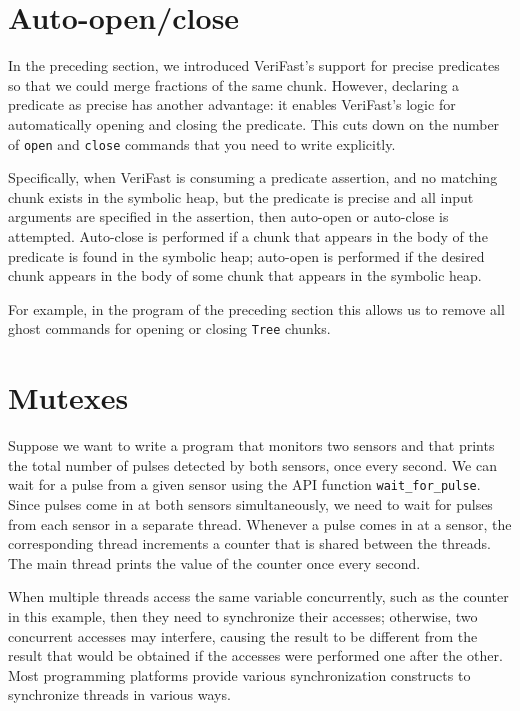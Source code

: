 \documentclass{article}
\begin{document}
\section{Auto-open/close}\label{section:auto-open-close}

In the preceding section, we introduced VeriFast's support for
precise predicates so that we could merge fractions of the same
chunk. However, declaring a predicate as precise has another
advantage: it enables VeriFast's logic for automatically
opening and closing the predicate. This cuts down on the number
of \lstinline|open| and \lstinline|close| commands that you
need to write explicitly.

Specifically, when VeriFast is consuming a predicate assertion,
and no matching chunk exists in the symbolic heap, but the
predicate is precise and all input arguments are specified in
the assertion, then auto-open or auto-close is attempted.
Auto-close is performed if a chunk that appears in the body of
the predicate is found in the symbolic heap; auto-open is
performed if the desired chunk appears in the body of some
chunk that appears in the symbolic heap.

For example, in the program of the preceding section this
allows us to remove all ghost commands for opening or closing
\lstinline|Tree| chunks.

\section{Mutexes}\label{section:mutexes}

Suppose we want to write a program that monitors two sensors
and that prints the total number of pulses detected by both
sensors, once every second. We can wait for a pulse from a
given sensor using the API function \lstinline!wait_for_pulse!.
Since pulses come in at both sensors simultaneously, we need to
wait for pulses from each sensor in a separate thread. Whenever
a pulse comes in at a sensor, the corresponding thread
increments a counter that is shared between the threads. The
main thread prints the value of the counter once every second.

When multiple threads access the same variable concurrently,
such as the counter in this example, then they need to
synchronize their accesses; otherwise, two concurrent accesses
may interfere, causing the result to be different from the
result that would be obtained if the accesses were performed
one after the other. Most programming platforms provide various
synchronization constructs to synchronize threads in various
ways.
\end{document}

